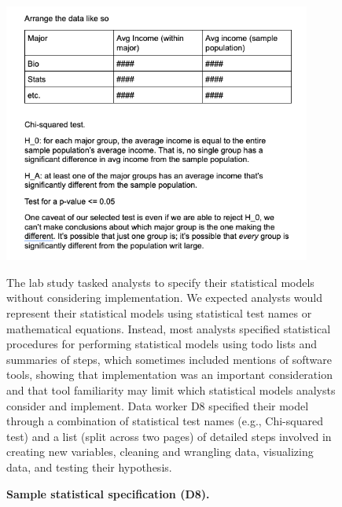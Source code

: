 {\begin{figure}
\begin{minipage}{0.45\textwidth}
            \includegraphics[width=0.9\textwidth]{hypothesisFormalization/figures/A11_SS_2.png} %
        \end{minipage}
        \caption{\textbf{Sample statistical specification (D8).}\label{figure:labStudyStatSpec}}
            \begin{small}
            \begin{minipage}{\linewidth}
            The lab study tasked analysts
            to specify their statistical models without
            considering implementation. 
            We expected analysts would represent
            their statistical models using statistical test names or mathematical equations. 
            Instead, most analysts specified statistical procedures for performing statistical models 
            using todo lists and summaries of steps,
            which sometimes included mentions of software tools, showing that
            implementation was an important consideration and
            that tool familiarity may limit which statistical models
            analysts consider and implement.
            Data worker D8 specified their model through a combination of statistical test names (e.g., Chi-squared test) and a list (split across two pages) of detailed steps
            involved in creating new variables, cleaning and wrangling data,
            visualizing data, and testing their hypothesis. 
            \end{minipage}
            \end{small}
    \end{figure}
}

